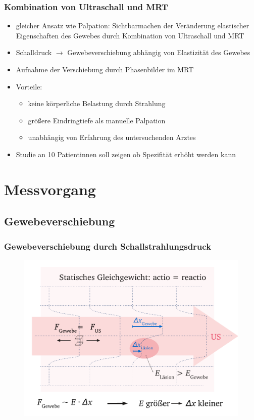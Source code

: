 \documentclass{beamer}
\begin{document}
		\begin{frame}
			\frametitle{Kombination von Ultraschall und MRT}
            \begin{itemize}
                \item
                    gleicher Ansatz wie Palpation: Sichtbarmachen der Veränderung elastischer
                    Eigenschaften des Gewebes durch Kombination von Ultraschall
                    und MRT
                \item
                    Schalldruck $\to$ Gewebeverschiebung abhängig von
                    Elastizität des Gewebes
                \item
                    Aufnahme der Verschiebung durch Phasenbilder im MRT
                \item
                    Vorteile:
                \begin{itemize}
                    \item 
                        keine körperliche Belastung durch Strahlung
                    \item
                        größere Eindringtiefe als manuelle Palpation
                    \item
                        unabhängig von Erfahrung des untersuchenden Arztes
                \end{itemize}
            \item
                Studie  an 10 Patientinnen soll zeigen ob Spezifität erhöht werden kann
            \end{itemize}
		\end{frame}

	\section{Messvorgang}

    \subsection{Gewebeverschiebung}

    \begin{frame}
        \frametitle{Gewebeverschiebung durch Schallstrahlungsdruck}
        \begin{figure}
            \centering
            \includegraphics[width=.7\textwidth]{../Abbildungen/Verschiebung_Gewebe.pdf}
        \end{figure}
    \end{frame}
\end{document}

